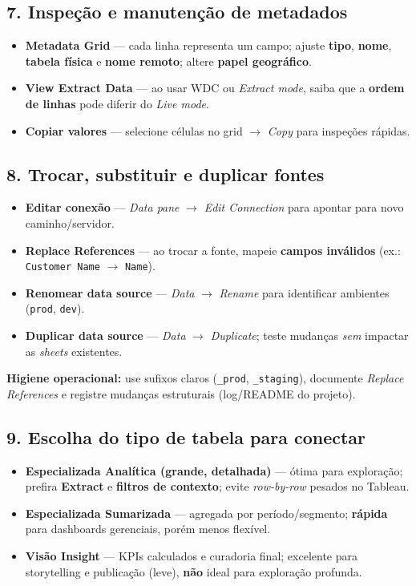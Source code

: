 \subsection*{7. Inspeção e manutenção de metadados}
\begin{itemize}[leftmargin=*]
  \item \textbf{Metadata Grid} — cada linha representa um campo; ajuste \textbf{tipo}, \textbf{nome}, \textbf{tabela física} e \textbf{nome remoto}; altere \textbf{papel geográfico}.
  \item \textbf{View Extract Data} — ao usar WDC ou \textit{Extract mode}, saiba que a \textbf{ordem de linhas} pode diferir do \textit{Live mode}.
  \item \textbf{Copiar valores} — selecione células no grid \(\rightarrow\) \textit{Copy} para inspeções rápidas.
\end{itemize}

\subsection*{8. Trocar, substituir e duplicar fontes}
\begin{itemize}[leftmargin=*]
  \item \textbf{Editar conexão} — \textit{Data pane} \(\rightarrow\) \textit{Edit Connection} para apontar para novo caminho/servidor.
  \item \textbf{Replace References} — ao trocar a fonte, mapeie \textbf{campos inválidos} (ex.: \texttt{Customer Name} \(\rightarrow\) \texttt{Name}).
  \item \textbf{Renomear data source} — \textit{Data} \(\rightarrow\) \textit{Rename} para identificar ambientes (\texttt{prod}, \texttt{dev}).
  \item \textbf{Duplicar data source} — \textit{Data} \(\rightarrow\) \textit{Duplicate}; teste mudanças \emph{sem} impactar as \textit{sheets} existentes.
\end{itemize}

\begin{NoteBox}
\textbf{Higiene operacional:} use sufixos claros (\texttt{\_prod}, \texttt{\_staging}), documente \textit{Replace References} e registre mudanças estruturais (log/README do projeto).
\end{NoteBox}

\subsection*{9. Escolha do tipo de tabela para conectar}
\begin{itemize}[leftmargin=*]
  \item \textbf{Especializada Analítica (grande, detalhada)} — ótima para exploração; prefira \textbf{Extract} e \textbf{filtros de contexto}; evite \textit{row-by-row} pesados no Tableau.
  \item \textbf{Especializada Sumarizada} — agregada por período/segmento; \textbf{rápida} para dashboards gerenciais, porém menos flexível.
  \item \textbf{Visão Insight} — KPIs calculados e curadoria final; excelente para storytelling e publicação (leve), \textbf{não} ideal para exploração profunda.
\end{itemize}

